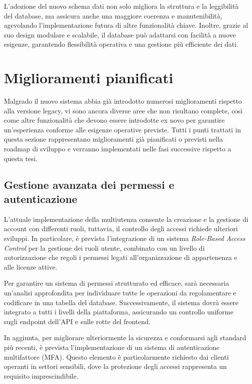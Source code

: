 L’adozione del nuovo schema dati non solo migliora la struttura e la leggibilità del database, ma assicura anche una maggiore coerenza e manutenibilità, agevolando l’implementazione futura di altre funzionalità chiave. Inoltre, grazie al suo design modulare e scalabile, il database può adattarsi con facilità a nuove esigenze, garantendo flessibilità operativa e una gestione più efficiente dei dati.

\section{Miglioramenti pianificati}
Malgrado il nuovo sistema abbia già introdotto numerosi miglioramenti rispetto alla versione legacy, vi sono ancora diverse aree che non risultano complete, così come altre funzionalità che devono essere introdotte ex novo per garantire un'esperienza conforme alle esigenze operative previste. Tutti i punti trattati in questa sezione rappresentano miglioramenti già pianificati o previsti nella roadmap di sviluppo e verranno implementati nelle fasi successive rispetto a questa tesi.

\subsection{Gestione avanzata dei permessi e autenticazione}
L’attuale implementazione della multiutenza consente la creazione e la gestione di account con differenti ruoli, tuttavia, il controllo degli accessi richiede ulteriori sviluppi. In particolare, è prevista l’integrazione di un sistema \textit{Role-Based Access Control} per la gestione dei ruoli utente, combinato con un livello di autorizzazione che regoli i permessi legati all’organizzazione di appartenenza e alle licenze attive.

Per garantire un sistema di permessi strutturato ed efficace, sarà necessaria un’analisi approfondita per individuare tutte le operazioni da regolamentare e codificare in una tabella del database. Successivamente, il sistema dovrà essere integrato a tutti i livelli della piattaforma, assicurando un controllo uniforme sugli endpoint dell’API e sulle rotte del frontend.

In aggiunta, per migliorare ulteriormente la sicurezza e conformarsi agli standard più recenti, è prevista l’implementazione di un sistema di autenticazione multifattore (MFA). Questo elemento è particolarmente richiesto dai clienti operanti in settori sensibili, dove la protezione degli accessi rappresenta un requisito imprescindibile.

